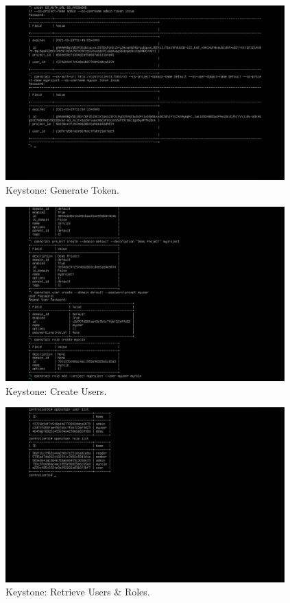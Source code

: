 \documentclass{article}
\begin{document}
\begin{figure}[ht]
    \centering
    \includegraphics[width=0.96\textwidth]{Keystone.png}
    \caption{Keystone: Generate Token.}
    \label{fig:Keystone}
\end{figure}

\begin{figure}[ht]
    \centering
    \includegraphics[width=0.96\textwidth]{CreateUsers.png}
    \caption{Keystone: Create Users.}
    \label{fig:CreateUsers}
\end{figure}

\begin{figure}[h!]
    \centering
    \includegraphics[width=0.96\textwidth]{RetrieveUserRole.png}
    \caption{Keystone: Retrieve Users \& Roles.}
    \label{fig:RetrieveUserRole}
\end{figure}
\end{document}
